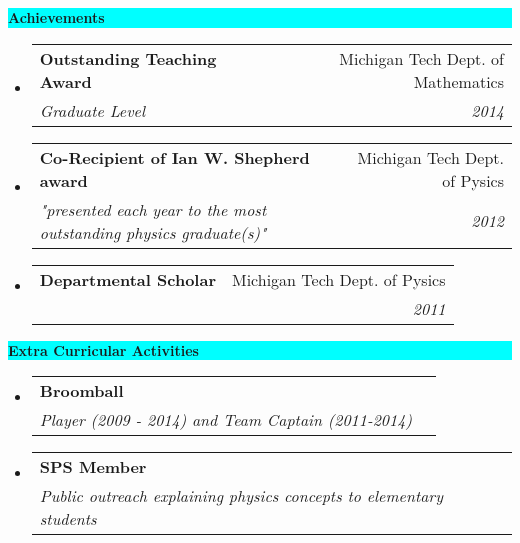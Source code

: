 \documentclass[letterpaper,10pt]{article}
\makeatletter
\newcommand{\resheading}[1]{{\large \colorbox{Cyan}{\begin{minipage}{\textwidth}{\textbf{#1 \vphantom{p\^{E}}}}\end{minipage}}}}
\newcommand{\ressubheading}[4]{
\begin{tabular*}{6.5in}{l@{\extracolsep{\fill}}r}
		\textbf{#1} & #2 \\
		\textit{#3} & \textit{#4} \\
\end{tabular*}\vspace{-6pt}}
\makeatother
\begin{document}
\resheading{Achievements}
\begin{itemize}
\item
\ressubheading{Outstanding Teaching Award}{Michigan Tech Dept. of Mathematics}{Graduate Level}{2014}
\item
\ressubheading{Co-Recipient of Ian W. Shepherd award}{Michigan Tech Dept. of Pysics}{"presented each year to the most outstanding physics graduate(s)"}{2012}
\item
\ressubheading{Departmental Scholar}{Michigan Tech Dept. of Pysics}{}{2011}

\end{itemize}

\resheading{Extra Curricular Activities}
\begin{itemize}
\item
	\ressubheading{Broomball}{}{Player (2009 - 2014) and Team Captain (2011-2014)}{}
\item
  \ressubheading{SPS Member}{}{Public outreach explaining physics concepts to elementary students}{}
\end{itemize}
\end{document}
